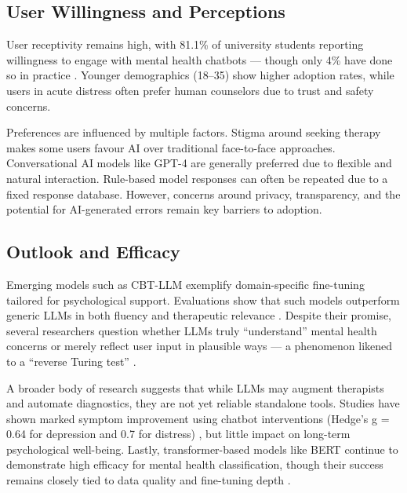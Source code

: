 \subsection{User Willingness and Perceptions}

User receptivity remains high, with 81.1\% of university students reporting willingness to engage with mental health chatbots — though only 4\% have done so in practice \cite{gbollie2023}. Younger demographics (18–35) show higher adoption rates, while users in acute distress often prefer human counselors due to trust and safety concerns.

Preferences are influenced by multiple factors. Stigma around seeking therapy makes some users favour AI over traditional face-to-face approaches. Conversational AI models like GPT-4 are generally preferred due to flexible and natural interaction. Rule-based model responses can often be repeated due to a fixed response database. However, concerns around privacy, transparency, and the potential for AI-generated errors remain key barriers to adoption.

\subsection{Outlook and Efficacy}

Emerging models such as CBT-LLM exemplify domain-specific fine-tuning tailored for psychological support. Evaluations show that such models outperform generic LLMs in both fluency and therapeutic relevance \cite{na2024}. Despite their promise, several researchers question whether LLMs truly “understand” mental health concerns or merely reflect user input in plausible ways — a phenomenon likened to a “reverse Turing test” \cite{sejnowski2023}.

A broader body of research suggests that while LLMs may augment therapists and automate diagnostics, they are not yet reliable standalone tools. Studies have shown marked symptom improvement using chatbot interventions (Hedge’s g = 0.64 for depression and 0.7 for distress) \cite{stade2024}, but little impact on long-term psychological well-being. Lastly, transformer-based models like BERT continue to demonstrate high efficacy for mental health classification, though their success remains closely tied to data quality and fine-tuning depth \cite{greco2023, li2023}.